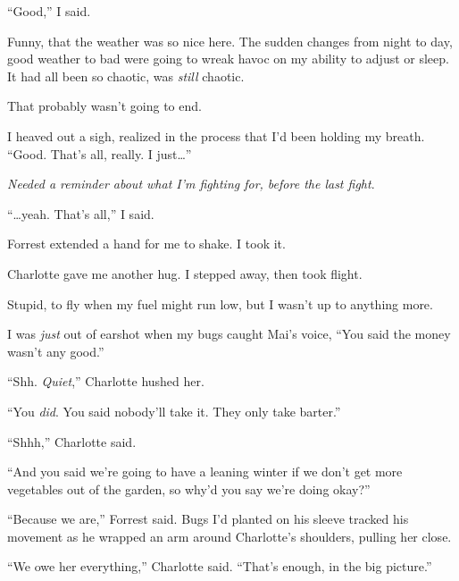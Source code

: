 ``Good,'' I said.



Funny, that the weather was so nice here.  The sudden changes from night to day, good weather to bad were going to wreak havoc on my ability to adjust or sleep.  It had all been so chaotic, was \emph{still} chaotic.



That probably wasn't going to end.



I heaved out a sigh, realized in the process that I'd been holding my breath.  ``Good.  That's all, really.  I just\ldots''



\emph{Needed a reminder about what I'm fighting for, before the last fight}.



``\ldots{}yeah.  That's all,'' I said.



Forrest extended a hand for me to shake.  I took it.



Charlotte gave me another hug.  I stepped away, then took flight.



Stupid, to fly when my fuel might run low, but I wasn't up to anything more.



I was \emph{just} out of earshot when my bugs caught Mai's voice, ``You said the money wasn't any good.''



``Shh.  \emph{Quiet},'' Charlotte hushed her.



``You \emph{did}.  You said nobody'll take it.  They only take barter.''



``Shhh,'' Charlotte said.



``And you said we're going to have a leaning winter if we don't get more vegetables out of the garden, so why'd you say we're doing okay?''



``Because we are,'' Forrest said.  Bugs I'd planted on his sleeve tracked his movement as he wrapped an arm around Charlotte's shoulders, pulling her close.



``We owe her everything,'' Charlotte said.  ``That's enough, in the big picture.''



